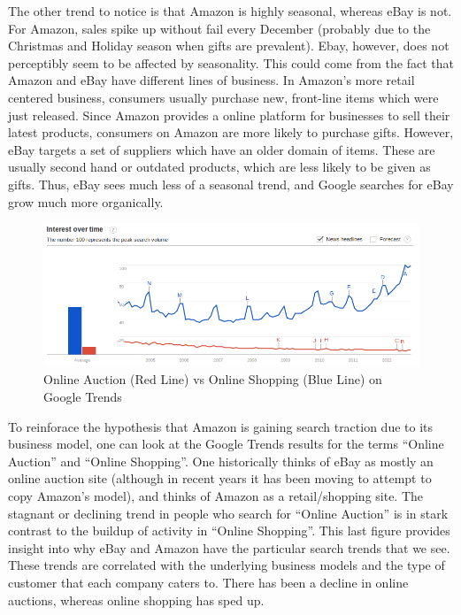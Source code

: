 \documentclass[psamsfonts]{amsart}
\newenvironment{sol}{\vspace{0.25cm}{\large \bfseries Solution:}}{\qedsymbol}
\begin{document}
\begin{sol}
The other trend to notice is that Amazon is highly seasonal, whereas eBay is not. For Amazon, sales spike up without fail every December (probably due to the Christmas and Holiday season when gifts are prevalent). Ebay, however, does not perceptibly seem to be affected by seasonality. This could come from the fact that Amazon and eBay have different lines of business. In Amazon's more retail centered business, consumers usually purchase new, front-line items which were just released. Since Amazon provides a online platform for businesses to sell their latest products, consumers on Amazon are more likely to purchase gifts. However, eBay targets a set of suppliers which have an older domain of items. These are usually second hand or outdated products, which are less likely to be given as gifts. Thus, eBay sees much less of a seasonal trend, and Google searches for eBay grow much more organically.

\begin{figure}[h!]
\includegraphics[width=6in]{online_shopping_vs_auction.png}
\caption{Online Auction (Red Line) vs Online Shopping (Blue Line) on Google Trends}
\end{figure}

To reinforace the hypothesis that Amazon is gaining search traction due to its business model, one can look at the Google Trends results for the terms ``Online Auction'' and ``Online Shopping''. One historically thinks of eBay as mostly an online auction site (although in recent years it has been moving to attempt to copy Amazon's model), and thinks of Amazon as a retail/shopping site. The stagnant or declining trend in people who search for ``Online Auction'' is in stark contrast to the buildup of activity in ``Online Shopping''. This last figure provides insight into why eBay and Amazon have the particular search trends that we see. These trends are correlated with the underlying business models and the type of customer that each company caters to. There has been a decline in online auctions, whereas online shopping has sped up. 
\end{sol}
\end{document}
